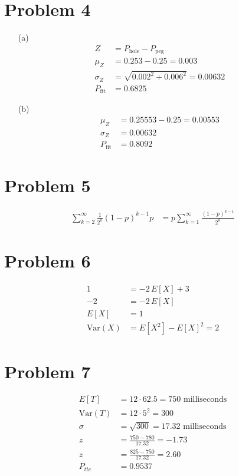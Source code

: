 \documentclass{article}
\begin{document}
\section*{Problem 4}
\begin{enumerate}
    \item[(a)]
    \begin{align*}
        Z &= P_{\text{hole}} - P_{\text{peg}} \\
        \mu_Z &= 0.253 - 0.25 = 0.003 \\
        \sigma_Z &= \sqrt{0.002^2 + 0.006^2} = 0.00632 \\
        P_{\text{fit}} &= 0.6825
    \end{align*}

    \item[(b)]
    \begin{align*}
        \mu_Z &= 0.25553 - 0.25 = 0.00553 \\
        \sigma_Z &= 0.00632 \\
        P_{\text{fit}} &= 0.8092
    \end{align*}
\end{enumerate}

\section*{Problem 5}
\begin{align*}
    \sum_{k=2}^\infty \frac{1}{2^k} (1 - p)^{k-1} p &= p \sum_{k=1}^\infty \frac{(1-p)^{k-1}}{2^k}
\end{align*}

\section*{Problem 6}
\begin{align*}
    1 &= -2 \, E[X] + 3 \\
    -2 &= -2 \, E[X] \\
    E[X] &= 1 \\
    \text{Var}(X) &= E[X^2] - E[X]^2 = 2
\end{align*}

\section*{Problem 7}
\begin{align*}
    E[T] &= 12 \cdot 62.5 = 750 \text{ milliseconds} \\
    \text{Var}(T) &= 12 \cdot 5^2 = 300 \\
    \sigma &= \sqrt{300} = 17.32 \text{ milliseconds} \\
    z &= \frac{750 - 780}{17.32} = -1.73 \\
    z &= \frac{825 - 750}{17.32} = 2.60 \\
    P_{ttc} &= 0.9537
\end{align*}
\end{document}
